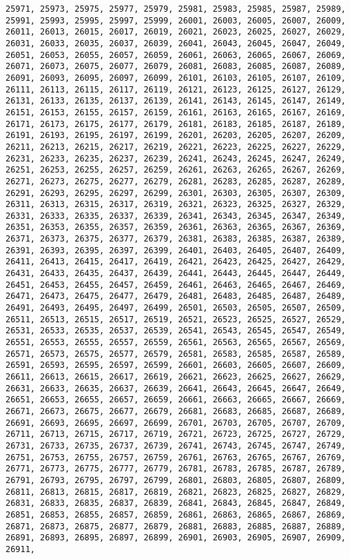 \documentclass[11pt]{article}
\begin{document}
\begin{Verbatim}[commandchars=\\\{\}]
25971, 25973, 25975, 25977, 25979, 25981, 25983, 25985, 25987, 25989, 25991, 25993, 25995, 25997, 25999, 26001, 26003, 26005, 26007, 26009, 26011, 26013, 26015, 26017, 26019, 26021, 26023, 26025, 26027, 26029, 26031, 26033, 26035, 26037, 26039, 26041, 26043, 26045, 26047, 26049, 26051, 26053, 26055, 26057, 26059, 26061, 26063, 26065, 26067, 26069, 26071, 26073, 26075, 26077, 26079, 26081, 26083, 26085, 26087, 26089, 26091, 26093, 26095, 26097, 26099, 26101, 26103, 26105, 26107, 26109, 26111, 26113, 26115, 26117, 26119, 26121, 26123, 26125, 26127, 26129, 26131, 26133, 26135, 26137, 26139, 26141, 26143, 26145, 26147, 26149, 26151, 26153, 26155, 26157, 26159, 26161, 26163, 26165, 26167, 26169, 26171, 26173, 26175, 26177, 26179, 26181, 26183, 26185, 26187, 26189, 26191, 26193, 26195, 26197, 26199, 26201, 26203, 26205, 26207, 26209, 26211, 26213, 26215, 26217, 26219, 26221, 26223, 26225, 26227, 26229, 26231, 26233, 26235, 26237, 26239, 26241, 26243, 26245, 26247, 26249, 26251, 26253, 26255, 26257, 26259, 26261, 26263, 26265, 26267, 26269, 26271, 26273, 26275, 26277, 26279, 26281, 26283, 26285, 26287, 26289, 26291, 26293, 26295, 26297, 26299, 26301, 26303, 26305, 26307, 26309, 26311, 26313, 26315, 26317, 26319, 26321, 26323, 26325, 26327, 26329, 26331, 26333, 26335, 26337, 26339, 26341, 26343, 26345, 26347, 26349, 26351, 26353, 26355, 26357, 26359, 26361, 26363, 26365, 26367, 26369, 26371, 26373, 26375, 26377, 26379, 26381, 26383, 26385, 26387, 26389, 26391, 26393, 26395, 26397, 26399, 26401, 26403, 26405, 26407, 26409, 26411, 26413, 26415, 26417, 26419, 26421, 26423, 26425, 26427, 26429, 26431, 26433, 26435, 26437, 26439, 26441, 26443, 26445, 26447, 26449, 26451, 26453, 26455, 26457, 26459, 26461, 26463, 26465, 26467, 26469, 26471, 26473, 26475, 26477, 26479, 26481, 26483, 26485, 26487, 26489, 26491, 26493, 26495, 26497, 26499, 26501, 26503, 26505, 26507, 26509, 26511, 26513, 26515, 26517, 26519, 26521, 26523, 26525, 26527, 26529, 26531, 26533, 26535, 26537, 26539, 26541, 26543, 26545, 26547, 26549, 26551, 26553, 26555, 26557, 26559, 26561, 26563, 26565, 26567, 26569, 26571, 26573, 26575, 26577, 26579, 26581, 26583, 26585, 26587, 26589, 26591, 26593, 26595, 26597, 26599, 26601, 26603, 26605, 26607, 26609, 26611, 26613, 26615, 26617, 26619, 26621, 26623, 26625, 26627, 26629, 26631, 26633, 26635, 26637, 26639, 26641, 26643, 26645, 26647, 26649, 26651, 26653, 26655, 26657, 26659, 26661, 26663, 26665, 26667, 26669, 26671, 26673, 26675, 26677, 26679, 26681, 26683, 26685, 26687, 26689, 26691, 26693, 26695, 26697, 26699, 26701, 26703, 26705, 26707, 26709, 26711, 26713, 26715, 26717, 26719, 26721, 26723, 26725, 26727, 26729, 26731, 26733, 26735, 26737, 26739, 26741, 26743, 26745, 26747, 26749, 26751, 26753, 26755, 26757, 26759, 26761, 26763, 26765, 26767, 26769, 26771, 26773, 26775, 26777, 26779, 26781, 26783, 26785, 26787, 26789, 26791, 26793, 26795, 26797, 26799, 26801, 26803, 26805, 26807, 26809, 26811, 26813, 26815, 26817, 26819, 26821, 26823, 26825, 26827, 26829, 26831, 26833, 26835, 26837, 26839, 26841, 26843, 26845, 26847, 26849, 26851, 26853, 26855, 26857, 26859, 26861, 26863, 26865, 26867, 26869, 26871, 26873, 26875, 26877, 26879, 26881, 26883, 26885, 26887, 26889, 26891, 26893, 26895, 26897, 26899, 26901, 26903, 26905, 26907, 26909, 26911, 
\end{Verbatim}
\end{document}

